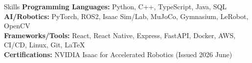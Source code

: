 \documentclass{resume}
\begin{document}
\begin{rSection}{Skills}
\textbf{Programming Languages:} Python, C++, TypeScript, Java, SQL  \\
\textbf{AI/Robotics:} PyTorch, ROS2, Isaac Sim/Lab, MuJoCo, Gymnasium, LeRobot, OpenCV \\
\textbf{Frameworks/Tools:} React, React Native, Express, FastAPI, Docker, AWS, CI/CD, Linux, Git, \LaTeX{} \\
\textbf{Certifications:} NVIDIA Isaac for Accelerated Robotics (Issued 2026 June)
\end{rSection}








\end{document}

